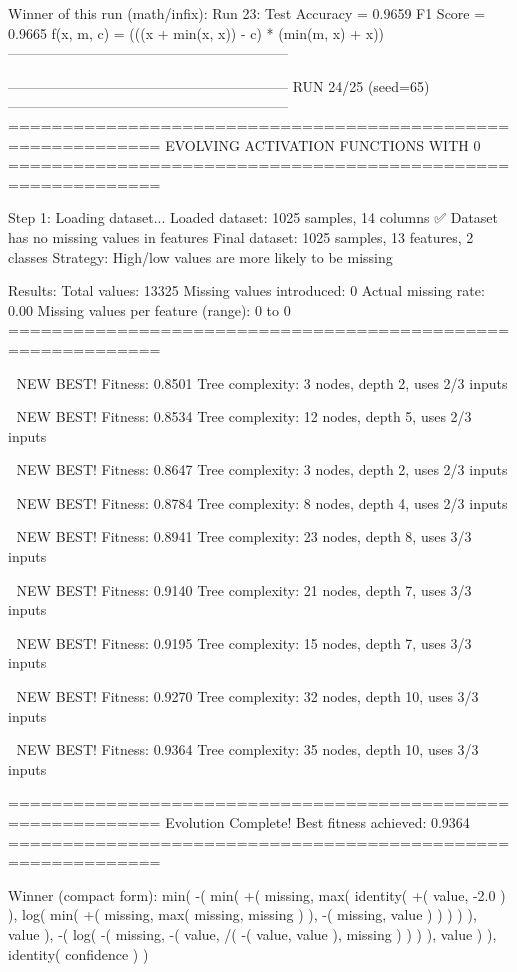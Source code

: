 Winner of this run (math/infix):
  Run 23:
     Test Accuracy = 0.9659
     F1 Score      = 0.9665
     f(x, m, c)    = (((x + min(x, x)) - c) * (min(m, x) + x))
------------------------------------------------------------

------------------------------------------------------------
RUN 24/25 (seed=65)
------------------------------------------------------------
============================================================
EVOLVING ACTIVATION FUNCTIONS
WITH 0%
============================================================

Step 1: Loading dataset...
Loaded dataset: 1025 samples, 14 columns
✅ Dataset has no missing values in features
Final dataset: 1025 samples, 13 features, 2 classes
Strategy: High/low values are more likely to be missing

Results:
  Total values: 13325
  Missing values introduced: 0
  Actual missing rate: 0.00%
  Missing values per feature (range): 0 to 0
============================================================


🎯 NEW BEST! Fitness: 0.8501
Tree complexity: 3 nodes, depth 2, uses 2/3 inputs

🎯 NEW BEST! Fitness: 0.8534
Tree complexity: 12 nodes, depth 5, uses 2/3 inputs

🎯 NEW BEST! Fitness: 0.8647
Tree complexity: 3 nodes, depth 2, uses 2/3 inputs

🎯 NEW BEST! Fitness: 0.8784
Tree complexity: 8 nodes, depth 4, uses 2/3 inputs

🎯 NEW BEST! Fitness: 0.8941
Tree complexity: 23 nodes, depth 8, uses 3/3 inputs

🎯 NEW BEST! Fitness: 0.9140
Tree complexity: 21 nodes, depth 7, uses 3/3 inputs

🎯 NEW BEST! Fitness: 0.9195
Tree complexity: 15 nodes, depth 7, uses 3/3 inputs

🎯 NEW BEST! Fitness: 0.9270
Tree complexity: 32 nodes, depth 10, uses 3/3 inputs

🎯 NEW BEST! Fitness: 0.9364
Tree complexity: 35 nodes, depth 10, uses 3/3 inputs

============================================================
Evolution Complete!
Best fitness achieved: 0.9364
============================================================

Winner (compact form):
 min(
  -(
    min(
      +(
        missing,
        max(
          identity(
            +(
              value,
              -2.0
            )
          ),
          log(
            min(
              +(
                missing,
                max(
                  missing,
                  missing
                )
              ),
              -(
                missing,
                value
              )
            )
          )
        )
      ),
      value
    ),
    -(
      log(
        -(
          missing,
          -(
            value,
            /(
              -(
                value,
                value
              ),
              missing
            )
          )
        )
      ),
      value
    )
  ),
  identity(
    confidence
  )
)

